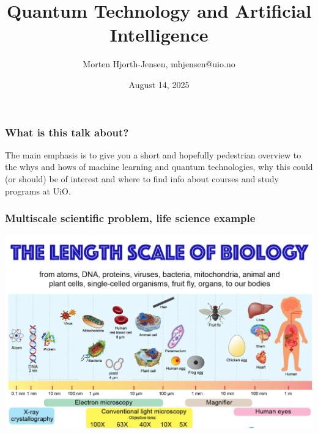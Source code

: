 \documentclass{beamer}
\begin{document}
\title[Quantum Computing and ML]{\textbf{Quantum Technology and Artificial Intelligence}}
\author{Morten Hjorth-Jensen, mhjensen@uio.no}
\date{August 14, 2025}





\begin{frame}
\titlepage
\end{frame}

\begin{frame}
\frametitle{What is this talk about?}

\begin{block}{}
The main emphasis is to give you a short and hopefully pedestrian overview  to the whys and hows of machine learning and quantum technologies, why this could (or should) be of interest and where to find info about courses and study programs at UiO. 
\end{block}

\end{frame}


\begin{frame}
\frametitle{Multiscale scientific problem, life science example}


\centerline{\includegraphics[width=1.05\linewidth]{figures/science2.png}}

\end{frame}
\end{document}
